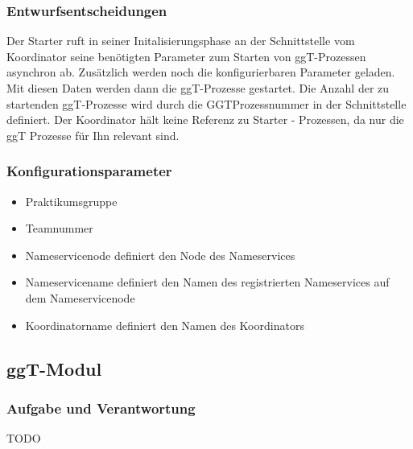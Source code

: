 \documentclass{article}
\begin{document}
\subsubsection{Entwurfsentscheidungen}
Der Starter ruft in seiner Initalisierungsphase an der Schnittstelle vom Koordinator seine benötigten Parameter zum
Starten von ggT-Prozessen asynchron ab. Zusätzlich werden noch die konfigurierbaren Parameter geladen. Mit diesen Daten
werden dann die ggT-Prozesse gestartet. Die Anzahl der zu startenden ggT-Prozesse wird durch die GGTProzessnummer in der
Schnittstelle definiert. Der Koordinator hält keine Referenz zu Starter - Prozessen, da nur die ggT Prozesse für Ihn
relevant sind.

\subsubsection{Konfigurationsparameter}
\begin{itemize}
    \item Praktikumsgruppe
    \item Teamnummer
    \item Nameservicenode definiert den Node des Nameservices
    \item Nameservicename definiert den Namen des registrierten Nameservices auf dem Nameservicenode
    \item Koordinatorname definiert den Namen des Koordinators
\end{itemize}

\newpage

\subsection{ggT-Modul}
\subsubsection{Aufgabe und Verantwortung}
TODO
\end{document}
